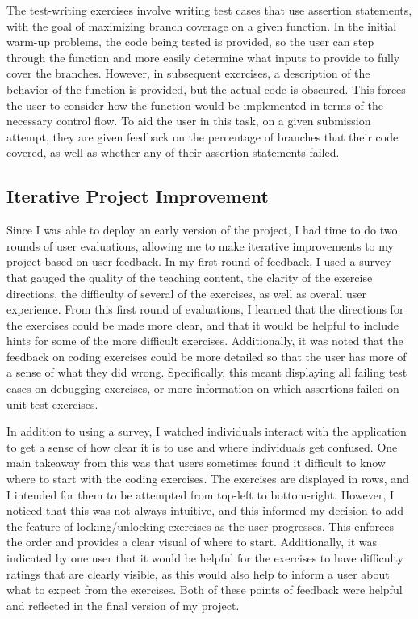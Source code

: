 \documentclass[10pt,twocolumn]{article}
\begin{document}
The test-writing exercises involve writing test cases that use assertion statements, with the goal of maximizing branch 
coverage on a given function. In the initial warm-up problems, the code being tested is provided, so the user can step 
through the function and more easily determine what inputs to provide to fully cover the branches. However, in subsequent 
exercises, a description of the behavior of the function is provided, but the actual code is obscured. This forces the 
user to consider how the function would be implemented in terms of the necessary control flow. To aid the user in this 
task, on a given submission attempt, they are given feedback on the percentage of branches that their code covered, as 
well as whether any of their assertion statements failed. 


\subsection{Iterative Project Improvement}

Since I was able to deploy an early version of the project, I had time to do two rounds of user evaluations, allowing me 
to make iterative improvements to my project based on user feedback. In my first round of feedback, I used a survey that 
gauged the quality of the teaching content, the clarity of the exercise directions, the difficulty of several of the 
exercises, as well as overall user experience. From this first round of evaluations, I learned that the directions for 
the exercises could be made more clear, and that it would be helpful to include hints for some of the more difficult 
exercises. Additionally, it was noted that the feedback on coding exercises could be more detailed so that the user 
has more of a sense of what they did wrong. Specifically, this meant displaying all failing test cases on debugging 
exercises, or more information on which assertions failed on unit-test exercises. 

In addition to using a survey, I watched individuals interact with the application to get a sense of how clear it is to 
use and where individuals get confused. One main takeaway from this was that users sometimes found it difficult to know 
where to start with the coding exercises. The exercises are displayed in rows, and I intended for them to be attempted 
from top-left to bottom-right. However, I noticed that this was not always intuitive, and this informed my decision to 
add the feature of locking/unlocking exercises as the user progresses. This enforces the order and provides a clear visual
of where to start. Additionally, it was indicated by one user that it would be helpful for the exercises to have difficulty 
ratings that are clearly visible, as this would also help to inform a user about what to expect from the exercises. Both 
of these points of feedback were helpful and reflected in the final version of my project. 
\end{document}

